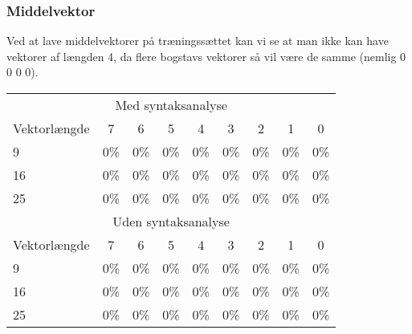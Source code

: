 \begin{comment}
Syntaks analyse: Hvilke hits bliver valgt på hitlisterne af syntaksanalysen (sæt maxhitno højt):

\begin{tabular}{|l|c|}\hline
\multicolumn{2}{|l|}{Træningssæt} \\\hline
Hitnr. & Valgt \\\hline
1 & 95,4\% \\\hline
2 & 3\% \\\hline
3 & 0\% \\\hline
4 & 0\% \\\hline
5 & 0\% \\\hline
6 & 0\% \\\hline \end{tabular}

\begin{tabular}{|l|c|}\hline
\multicolumn{2}{|l|}{Kontrolsæt} \\\hline
Hitnr. & Valgt \\\hline
1 & 92,9\% \\\hline
2 & 0\% \\\hline
3 & 0\% \\\hline
4 & 0\% \\\hline
5 & 0\% \\\hline
6 & 0\% \\\hline \end{tabular}

\end{comment} %

\subsubsection*{Middelvektor}

Ved at lave middelvektorer på træningssættet kan vi se at man ikke kan have vektorer af længden 4, da flere bogstavs vektorer så vil være de samme (nemlig 0 0 0 0).

\begin{tabular}{|l|c|c|c|c|c|c|c|c|}\hline
\rowcolor[gray]{0.9} \multicolumn{9}{|>{\columncolor[gray]{0.9}}c|}{\textbf{Træningssæt}} \\\hline
\multicolumn{9}{|c|}{Med syntaksanalyse}\\\hline
Vektorlængde & 7 & 6 & 5 & 4 & 3 & 2 & 1 & 0\\\hline
9 & 0\% & 0\% & 0\% & 0\% & 0\% & 0\% & 0\% & 0\% \\\hline
16 & 0\% & 0\% & 0\% & 0\% & 0\% & 0\% & 0\% & 0\%\\\hline
25 & 0\% & 0\% & 0\% & 0\% & 0\% & 0\% & 0\% & 0\%\\\hline 
\multicolumn{9}{|c|}{Uden syntaksanalyse}\\\hline
Vektorlængde & 7 & 6 & 5 & 4 & 3 & 2 & 1 & 0\\\hline
9 & 0\% & 0\% & 0\% & 0\% & 0\% & 0\% & 0\% & 0\% \\\hline
16 & 0\% & 0\% & 0\% & 0\% & 0\% & 0\% & 0\% & 0\%\\\hline
25 & 0\% & 0\% & 0\% & 0\% & 0\% & 0\% & 0\% & 0\%\\\hline 
\end{tabular}

